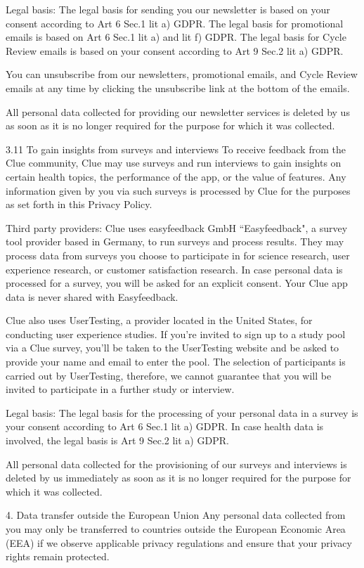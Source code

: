 Legal basis: The legal basis for sending you our newsletter is based on your consent according to Art 6 Sec.1 lit a) GDPR. The legal basis for promotional emails is based on Art 6 Sec.1 lit a) and lit f) GDPR. The legal basis for Cycle Review emails is based on your consent according to Art 9 Sec.2 lit a) GDPR.

You can unsubscribe from our newsletters, promotional emails, and Cycle Review emails at any time by clicking the unsubscribe link at the bottom of the emails.

All personal data collected for providing our newsletter services is deleted by us as soon as it is no longer required for the purpose for which it was collected.

3.11 To gain insights from surveys and interviews
To receive feedback from the Clue community, Clue may use surveys and run interviews to gain insights on certain health topics, the performance of the app, or the value of features. Any information given by you via such surveys is processed by Clue for the purposes as set forth in this Privacy Policy.

Third party providers: Clue uses easyfeedback GmbH “Easyfeedback", a survey tool provider based in Germany, to run surveys and process results. They may process data from surveys you choose to participate in for science research, user experience research, or customer satisfaction research. In case personal data is processed for a survey, you will be asked for an explicit consent. Your Clue app data is never shared with Easyfeedback.

Clue also uses UserTesting, a provider located in the United States, for conducting user experience studies. If you’re invited to sign up to a study pool via a Clue survey, you’ll be taken to the UserTesting website and be asked to provide your name and email to enter the pool. The selection of participants is carried out by UserTesting, therefore, we cannot guarantee that you will be invited to participate in a further study or interview.

Legal basis: The legal basis for the processing of your personal data in a survey is your consent according to Art 6 Sec.1 lit a) GDPR. In case health data is involved, the legal basis is Art 9 Sec.2 lit a) GDPR.

All personal data collected for the provisioning of our surveys and interviews is deleted by us immediately as soon as it is no longer required for the purpose for which it was collected.

4. Data transfer outside the European Union
Any personal data collected from you may only be transferred to countries outside the European Economic Area (EEA) if we observe applicable privacy regulations and ensure that your privacy rights remain protected.

